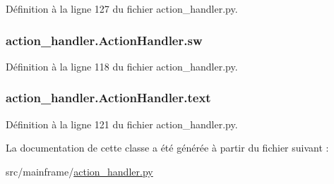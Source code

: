 Définition à la ligne 127 du fichier action\+\_\+handler.\+py.

\hypertarget{classaction__handler_1_1_action_handler_ae7daf04ab97af90c74394a2a860fcb0c}{}
\subsubsection[{sw}]{\setlength{\rightskip}{0pt plus 5cm}action\+\_\+handler.\+Action\+Handler.\+sw}\label{classaction__handler_1_1_action_handler_ae7daf04ab97af90c74394a2a860fcb0c}


Définition à la ligne 118 du fichier action\+\_\+handler.\+py.

\hypertarget{classaction__handler_1_1_action_handler_a30a752ec44884f0ec249a2222746723a}{}
\subsubsection[{text}]{\setlength{\rightskip}{0pt plus 5cm}action\+\_\+handler.\+Action\+Handler.\+text}\label{classaction__handler_1_1_action_handler_a30a752ec44884f0ec249a2222746723a}


Définition à la ligne 121 du fichier action\+\_\+handler.\+py.



La documentation de cette classe a été générée à partir du fichier suivant \+:\begin{DoxyCompactItemize}
\item 
src/mainframe/\hyperlink{action__handler_8py}{action\+\_\+handler.\+py}\end{DoxyCompactItemize}
